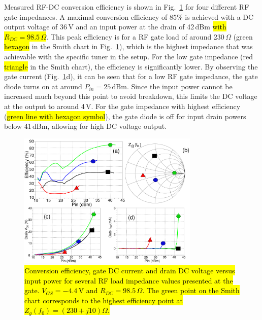 Measured RF-DC conversion efficiency is shown in Fig.~\ref{MEAS_LP_sweep} for four different RF gate impedances. A maximal conversion efficiency of 85\% is achieved with a DC output voltage of 36\,V and an input power at the drain of 42\,dBm \hl{with $R_{DC}=98.5\,\Omega$}. This peak efficiency is for a RF gate load of around 230\,$\Omega$ (green \hl{hexagon} in the Smith chart in Fig.~\ref{MEAS_LP_sweep}), which is the highest impedance that was achievable with the specific tuner in the setup. For the low gate impedance (red \hl{triangle} in the Smith chart), the efficiency is significantly lower. By observing the gate current (Fig.~\ref{MEAS_LP_sweep}d), it can be seen that for a low RF gate impedance, the gate diode turns on at around $P_{in}=25$\,dBm. Since the input power cannot be increased much beyond this point to avoid breakdown, this limits the DC voltage at the output to around 4\,V. For the gate impedance with highest efficiency (\hl{green line with hexagon symbol}), the gate diode is off for input drain powers below 41\,dBm, allowing for high DC voltage output.






\begin{figure}[ht!]
\centering
\includegraphics[width=3.4in]{pdf/12.pdf}
\caption{\hl{Conversion efficiency, gate DC current and drain DC voltage versus input power for several RF load impedance values presented at the gate. $V_{GS}=-4.4$\,V and $R_{DC}=98.5$\,$\Omega$. The green point on the Smith chart corresponds to the highest efficiency point at $Z_g(f_0)=\left(230+j10\right)\Omega$. }}
\label{MEAS_LP_sweep}
\end{figure}







